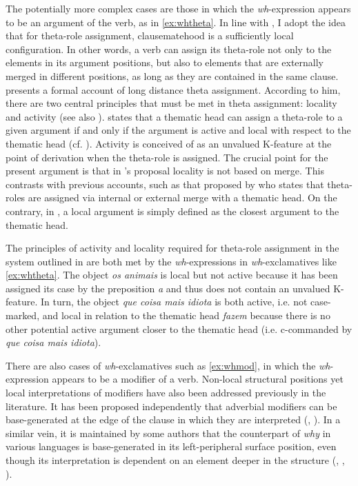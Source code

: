 The potentially more complex  cases are those in which the \textit{wh}-expression appears to be an argument of the verb, as in \eqref{ex:whtheta}. In line with \citet{VillaGarcia2015}, I adopt the idea that for theta-role assignment, clausematehood is a sufficiently local configuration. In other words, a verb can assign its theta-role not only to the elements in its argument positions, but  also to elements that are externally merged in different positions, as long as they are contained in the same clause.  \citet{Saab2015} presents a formal account of long distance theta assignment. According to him, there are two central principles  that must be met in theta assignment: locality and activity (see also \citealt{Chomsky2000, Chomsky2001}).  \citet{Saab2015} states that a thematic head can assign a theta-role to a given argument if and only if the argument is active and local with respect to the thematic head (cf. \citealt[2]{Saab2015}).  Activity is conceived of as an unvalued K-feature at the point of derivation when the theta-role is assigned. The crucial point for the present argument is that in \citeauthor{Saab2015}'s proposal locality is not based on merge. This contrasts with previous accounts, such as that proposed by \citet{Sheehan2012} who states that theta-roles are assigned via internal or external merge with a thematic head. On the contrary, in \citet{Saab2015},   a local argument is simply defined as the closest argument to the thematic head.  
 
The principles of activity and locality required for theta-role assignment in the system outlined in \citet{Saab2015}  are both met by  the \textit{wh}-expressions in \textit{wh}-exclamatives like \eqref{ex:whtheta}. The object \emph{os animais} is local but not active because it has been assigned its case by the preposition \emph{a}  and thus does not contain an unvalued K-feature. In turn, the object \emph{que coisa mais idiota} is both active, i.e. not case-marked, and local in relation to the thematic head \emph{fazem} because there is no other potential active argument  closer  to the thematic head (i.e. c-commanded by \emph{que coisa mais idiota}). 
 
There are also cases of \textit{wh}-exclamatives such as \eqref{ex:whmod}, in which the \textit{wh}-ex\-pres\-sion appears to be a modifier of a verb. Non-local structural  positions yet local  interpretations of  modifiers have also been addressed previously in the literature. It has been proposed independently that adverbial modifiers can be base-generated at the edge of the clause in which they are interpreted  (\citealt[46--51]{Rizzi1990}, \citealt{Uriagereka1988}). 
   In a similar vein, it is maintained by some authors that the counterpart of \emph{why} in various languages is base-generated in its left-peripheral surface position, even though its interpretation is dependent on an element deeper in the structure (\citealt{Hornstein1995}, \citealt{Rizzi1990, Rizzi2001}, \citealt{Shlonsky2011}).




